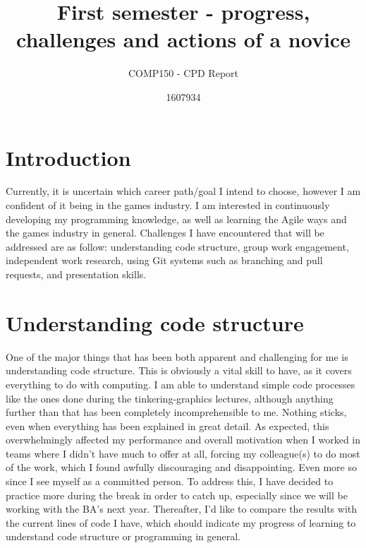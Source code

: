 \documentclass{scrartcl}
\title{First semester - progress, challenges and actions of a novice}
\subtitle{COMP150 - CPD Report}
\author{1607934}
\begin{document}
\maketitle

\section{Introduction}

Currently, it is uncertain which career path/goal I intend to choose, however I am confident of it being in the games industry. I am interested in continuously developing my programming knowledge, as well as learning the Agile ways and the games industry in general. Challenges I have encountered that will be addressed are as follow: understanding code structure, group work engagement, independent work research, using Git systems such as branching and pull requests, and presentation skills. 

\section{Understanding code structure}
One of the major things that has been both apparent and challenging for me is understanding code structure. This is obviously a vital skill to have, as it covers everything to do with computing. I am able to understand simple code processes like the ones done during the tinkering-graphics lectures, although anything further than that has been completely incomprehensible to me. Nothing sticks, even when everything has been explained in great detail. As expected, this overwhelmingly affected my performance and overall motivation when I worked in teams where I didn't have much to offer at all, forcing my colleague(s) to do most of the work, which I found awfully discouraging and disappointing. Even more so since I see myself as a committed person. To address this, I have decided to practice more during the break in order to catch up, especially since we will be working with the BA's next year. Thereafter, I'd like to compare the results with the current lines of code I have, which should indicate my progress of learning to understand code structure or programming in general.  
\end{document}

